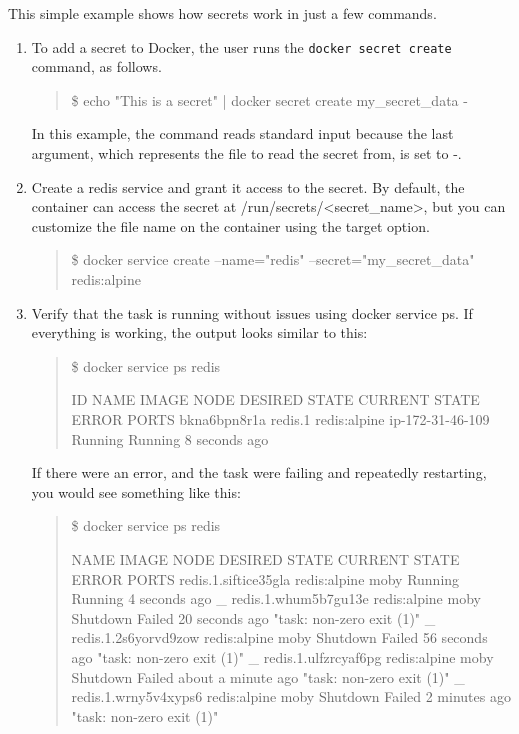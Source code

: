 This simple example shows how secrets work in just a few commands. 
\begin{enumerate}
\item To add a secret to Docker, the user runs the {\tt docker 
secret create} command, as follows.   
\begin{quote}
\$ echo "This is a secret" | docker secret create my\_secret\_data -
\end{quote}

In this example, the command reads standard input because the last argument, 
which represents the file to read the secret from, is set to -.


\item
Create a redis service and grant it access to the secret. By default, the
container can access the secret at /run/secrets/<secret\_name>, but you can
customize the file name on the container using the target option.

\begin{quote}
\$ docker service  create --name="redis" --secret="my\_secret\_data"
redis:alpine
\end{quote}

\item
Verify that the task is running without issues using docker service ps. If
everything is working, the output looks similar to this:

\begin{quote}
\$ docker service ps redis

ID            NAME     IMAGE         NODE              DESIRED STATE
CURRENT STATE          ERROR  PORTS
bkna6bpn8r1a  redis.1  redis:alpine  ip-172-31-46-109  Running
Running 8 seconds ago  
\end{quote}

If there were an error, and the task were failing and repeatedly
restarting, you would see something like this:

\begin{quote}
\$ docker service ps redis

NAME                      IMAGE         NODE  DESIRED STATE  CURRENT STATE
ERROR                      PORTS
redis.1.siftice35gla      redis:alpine  moby  Running        Running 4
seconds ago                             
 \_ redis.1.whum5b7gu13e  redis:alpine  moby  Shutdown       Failed 20
seconds ago      "task: non-zero exit (1)"  
 \_ redis.1.2s6yorvd9zow  redis:alpine  moby  Shutdown       Failed 56
seconds ago      "task: non-zero exit (1)"  
 \_ redis.1.ulfzrcyaf6pg  redis:alpine  moby  Shutdown       Failed about a
minute ago  "task: non-zero exit (1)"  
 \_ redis.1.wrny5v4xyps6  redis:alpine  moby  Shutdown       Failed 2
minutes ago       "task: non-zero exit (1)"
\end{quote}


\end{enumerate}
